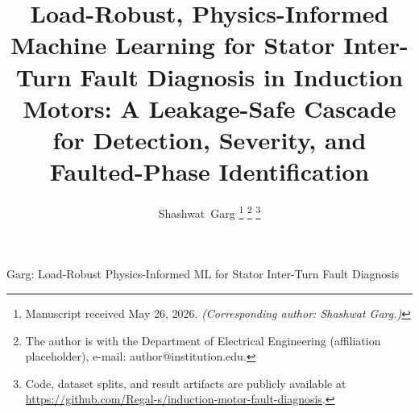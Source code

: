 \documentclass[journal]{IEEEtran}
\begin{document}
\title{Load-Robust, Physics-Informed Machine Learning for Stator Inter-Turn Fault
Diagnosis in Induction Motors: A Leakage-Safe Cascade for Detection, Severity, and
Faulted-Phase Identification}

\author{Shashwat~Garg%
\thanks{Manuscript received May 26, 2026. \emph{(Corresponding author: Shashwat Garg.)}}%
\thanks{The author is with the Department of Electrical Engineering (affiliation
placeholder), e-mail: author@institution.edu.}%
\thanks{Code, dataset splits, and result artifacts are publicly available at
\url{https://github.com/Regal-s/induction-motor-fault-diagnosis}.}}

%
{Garg: Load-Robust Physics-Informed ML for Stator Inter-Turn Fault Diagnosis}

\maketitle
\end{document}
